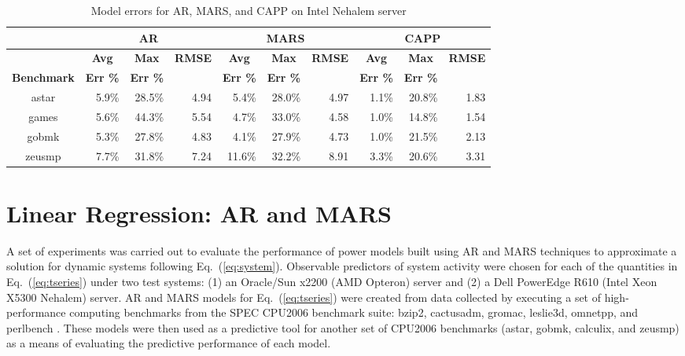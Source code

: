 \documentclass[times,10pt,finalversion]{usetex-v1}
\begin{document}
\begin{small}
\begin{table}[tbp]
  \centering
    \caption{Model errors for AR, MARS, and CAPP on Intel Nehalem server}
    \label{tab:modelerroroptIntel}
    \begin{tabular}[phtb]{c |r r r|r r r|r r r}
      \hline
      \multicolumn{1}{c|}{}&\multicolumn{3}{c|}{\textbf{AR}}&\multicolumn{3}{c|}{\textbf{MARS}}&\multicolumn{3}{c}{\textbf{CAPP}}\\
        \hline
  &\multicolumn{1}{c}{\textbf{Avg}}&\multicolumn{1}{c}{\textbf{Max}}&\multicolumn{1}{c|}{\textbf{RMSE}}&\multicolumn{1}{c}{\textbf{Avg}}&\multicolumn{1}{c}{\textbf{Max}}&\multicolumn{1}{c|}{\textbf{RMSE}}&\multicolumn{1}{c}{\textbf{Avg}}&\multicolumn{1}{c}{\textbf{Max}}&\multicolumn{1}{c}{\textbf{RMSE}}\\
\multicolumn{1}{c|}{\textbf{Benchmark}}&\multicolumn{1}{c}{\textbf{Err \%}}&\multicolumn{1}{c}{\textbf{Err \%}}&\multicolumn{1}{c|}{}&\multicolumn{1}{c}{\textbf{Err \%}}&\multicolumn{1}{c}{\textbf{Err \%}}&\multicolumn{1}{c|}{\textbf{}}&\multicolumn{1}{c}{\textbf{Err \%}}&\multicolumn{1}{c}{\textbf{Err \%}}&\multicolumn{1}{c}{}\\
      \hline
      astar &5.9\%&28.5\%&4.94&5.4\%&28.0\%&4.97&1.1\%&20.8\%&1.83\\
      games &5.6\%&44.3\%&5.54&4.7\%&33.0\%&4.58&1.0\%&14.8\%&1.54\\
      gobmk &5.3\%&27.8\%&4.83&4.1\%&27.9\%&4.73&1.0\%&21.5\%&2.13\\
      zeusmp&7.7\%&31.8\%&7.24&11.6\%&32.2\%&8.91&3.3\%&20.6\%&3.31\\
      \hline
    \end{tabular}
  \end{table}
\end{small}
\section{Linear Regression: AR and  MARS}
\label{sec:linear}
A set of experiments was carried out to evaluate the performance of
power models built using AR and MARS techniques to approximate a
solution for dynamic systems following Eq.~(\ref{eq:system}). Observable
predictors of system activity were chosen for each of the quantities in
Eq.~(\ref{eq:tseries}) under two test systems: (1) an Oracle/Sun x2200
(AMD Opteron) server and (2) a Dell PowerEdge R610 (Intel Xeon X5300
Nehalem) server.  AR and MARS models for Eq.~(\ref{eq:tseries})
were created from data collected by executing a set of high-performance
computing benchmarks from the SPEC CPU2006 benchmark suite: bzip2,
cactusadm, gromac, leslie3d, omnetpp, and perlbench
\cite{Spec2006}. These models were then used as a predictive tool for
another set of CPU2006 benchmarks (astar, gobmk, calculix, and zeusmp)
as a means of evaluating the predictive performance of each model.
\end{document}
